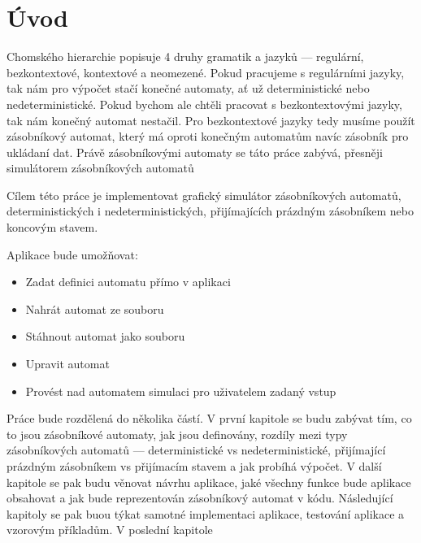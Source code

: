 \chapter{Úvod}    
    Chomského hierarchie popisuje 4 druhy gramatik a jazyků --- regulární, bezkontextové, kontextové a neomezené. Pokud pracujeme s regulárními jazyky, tak nám pro výpočet stačí konečné automaty, ať už deterministické nebo nedeterministické. Pokud bychom ale chtěli pracovat s bezkontextovými jazyky, tak nám konečný automat nestačil. Pro bezkontextové jazyky tedy musíme použít zásobníkový automat, který má oproti konečným automatům navíc zásobník pro ukládaní dat. Právě zásobníkovými automaty se táto práce zabývá, přesněji simulátorem zásobníkových automatů

    Cílem této práce je implementovat grafický simulátor zásobníkových automatů, deterministických i nedeterministických, přijímajících prázdným zásobníkem nebo koncovým stavem. 
    
    Aplikace bude umožňovat:

    \begin{itemize}
        \item Zadat definici automatu přímo v aplikaci
        \item Nahrát automat ze souboru
        \item Stáhnout automat jako souboru
        \item Upravit automat
        \item Provést nad automatem simulaci pro uživatelem zadaný vstup
    \end{itemize}

    Práce bude rozdělená do několika částí. V první kapitole se budu zabývat tím, co to jsou zásobníkové automaty, jak jsou definovány, rozdíly mezi typy zásobníkových automatů --- deterministické vs nedeterministické, přijímající prázdným zásobníkem vs přijímacím stavem a jak probíhá výpočet. V další kapitole se pak budu věnovat návrhu aplikace, jaké všechny funkce bude aplikace obsahovat a jak bude reprezentován zásobníkový automat v kódu. Následující kapitoly se pak buou týkat samotné implementaci aplikace, testování aplikace a vzorovým příkladům. V poslední kapitole %
\endinput